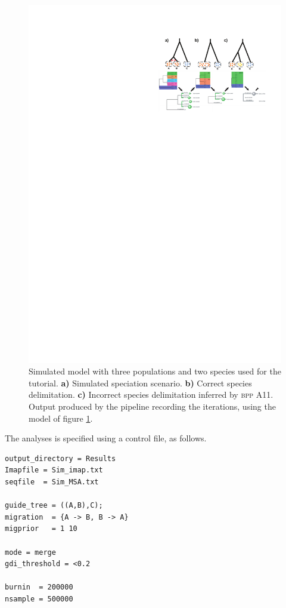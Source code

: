 \documentclass[A4]{article1}
\newcommand{\red}[1]{{\color{red}{#1}}}
\begin{document}
\begin{figure}
    \centering
    \includegraphics[scale=0.75]{figs/fig-ABC}

    \caption{\red{[Delete this. We are using the ABCDX example.]} Simulated model with
   three populations and two species used for the tutorial. \textbf{a)} Simulated
   speciation scenario. \textbf{b)} Correct species delimitation. \textbf{c)} Incorrect
   species delimitation inferred by \textsc{bpp} A11. %
   Output produced by the pipeline recording the iterations, using the model of figure
   \ref{fig:ABC-demo}.  %
} \label{fig:ABC-demo}
\end{figure}


The analyses is specified using a control file, as follows.

\begin{small}
\begin{verbatim}
output_directory = Results
Imapfile = Sim_imap.txt
seqfile  = Sim_MSA.txt

guide_tree = ((A,B),C);
migration  = {A -> B, B -> A}
migprior   = 1 10

mode = merge
gdi_threshold = <0.2

burnin  = 200000
nsample = 500000
\end{verbatim}
\end{small}
\end{document}
